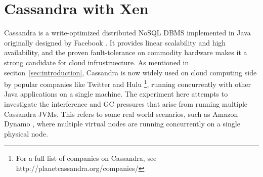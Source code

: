 \documentclass{sig-alternate}
\begin{document}


\section{Cassandra with Xen}

Cassandra is a write-optimized distributed NoSQL DBMS implemented in Java originally designed by Facebook \cite{lakshman2010cassandra}. It provides linear scalability and high availability, and the proven fault-tolerance on commodity hardware makes it a strong candidate for cloud infrustruecture. As mentioned in seciton~\ref{sec:introduction}, Cassandra is now widely used on cloud computing side by popular companies like Twitter and Hulu \footnote{For a full list of companies on Cassandra, see http://planetcassandra.org/companies/}, running concurrently with other Java applications on a single machine. The experiment here attempts to investigate the interference and GC pressures that arise from running multiple Cassandra JVMs. This refers to some real world scenarios, such as Amazon Dynamo \cite{hastorun2007dynamo}, where multiple virtual nodes are running concurrently on a single physical node.
\end{document}
